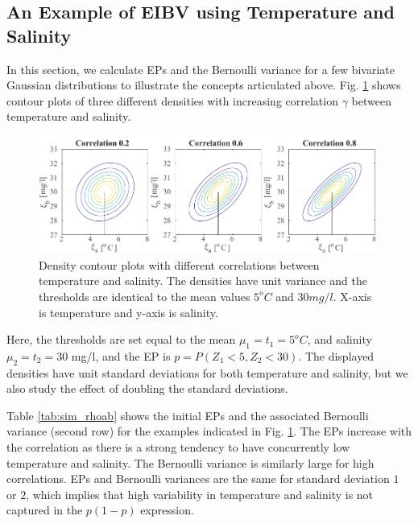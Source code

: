 \documentclass[aoas]{imsart}
\begin{document}
\subsection{An Example of EIBV using Temperature and Salinity}
\label{Sec:UnivarEx}

In this section, we calculate EPs and the Bernoulli variance for a few bivariate
Gaussian distributions to illustrate the concepts articulated above.
Fig. \ref{illus_bivarDens} shows contour plots of three different
densities with increasing correlation $\gamma$ between temperature and
salinity.
\begin{figure}[h!] \centering
  \includegraphics[width=0.99\textwidth]{Figures/illus_bivar.pdf}
  \caption{Density contour plots with different correlations between
    temperature and salinity. The densities have unit variance and the
    thresholds are identical to the mean values $5^o C$ and
    $30 mg/l$. X-axis is temperature and y-axis is salinity.}
\label{illus_bivarDens}
\end{figure}
Here, the thresholds are set equal to the mean $\mu_1=t_1=5^o C$, and
salinity $\mu_2=t_2=30$ mg/l, and the EP is $p=P(Z_1 < 5,Z_2 < 30)$. The displayed densities have unit
standard deviations for both temperature and salinity, but we also
study the effect of doubling the standard deviations.

Table \ref{tab:sim_rhoab} shows the initial EPs and the associated Bernoulli
variance (second row) for the examples indicated in
Fig. \ref{illus_bivarDens}. The EPs increase with the correlation as
there is a strong tendency to have concurrently low temperature and
salinity. The Bernoulli variance is similarly large for high
correlations. EPs and Bernoulli variances are the same for standard
deviation $1$ or $2$, which implies that high variability in
temperature and salinity is not captured in the $p(1-p)$ expression.
\end{document}
